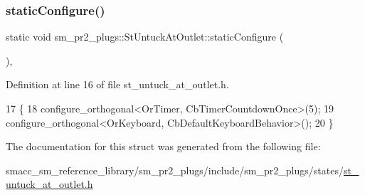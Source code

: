 \subsubsection{\texorpdfstring{static\+Configure()}{staticConfigure()}}
{\footnotesize\ttfamily static void sm\+\_\+pr2\+\_\+plugs\+::\+St\+Untuck\+At\+Outlet\+::static\+Configure (\begin{DoxyParamCaption}{ }\end{DoxyParamCaption})\hspace{0.3cm}{\ttfamily [inline]}, {\ttfamily [static]}}



Definition at line 16 of file st\+\_\+untuck\+\_\+at\+\_\+outlet.\+h.


\begin{DoxyCode}
17     \{
18         configure\_orthogonal<OrTimer,  CbTimerCountdownOnce>(5);    
19         configure\_orthogonal<OrKeyboard, CbDefaultKeyboardBehavior>();
20     \}
\end{DoxyCode}


The documentation for this struct was generated from the following file\+:\begin{DoxyCompactItemize}
\item 
smacc\+\_\+sm\+\_\+reference\+\_\+library/sm\+\_\+pr2\+\_\+plugs/include/sm\+\_\+pr2\+\_\+plugs/states/\hyperlink{st__untuck__at__outlet_8h}{st\+\_\+untuck\+\_\+at\+\_\+outlet.\+h}\end{DoxyCompactItemize}
